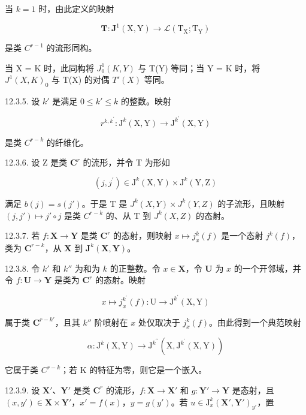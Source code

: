 当 \(k = 1\) 时，由此定义的映射

\[
\mathbf {T} \colon \mathbf {J} ^ {1} (\mathrm{X}, \mathrm{Y}) \rightarrow \mathcal {L} (\mathrm{T} _ {\mathrm{X}}; \mathrm{T} _ {\mathrm{Y}})
\]

是类 \(C^{r-1}\) 的流形同构。

当 X = K 时，此同构将 \(J_{0}^{1}(K, Y)\) 与 T(Y) 等同；当 Y = K 时，将 \(J^{1}(X, K)_{0}\) 与 T(X) 的对偶 \(T'(X)\) 等同。

12.3.5. 设 \(k'\) 是满足 \(0 \leqslant k' \leqslant k\) 的整数。映射

\[
r ^ {k, k ^ {\prime}}: \mathrm{J} ^ {k} (\mathrm{X}, \mathrm{Y}) \rightarrow \mathrm{J} ^ {k ^ {\prime}} (\mathrm{X}, \mathrm{Y})\tag{cf. 12.1.5}
\]

是类 \(C^{r-k}\) 的纤维化。

12.3.6. 设 Z 是类 \(\mathbf{C}^r\) 的流形，并令 T 为形如

\[
(j, j ^ {\prime}) \in \mathrm{J} ^ {k} (\mathrm{X}, \mathrm{Y}) \times \mathrm{J} ^ {k} (\mathrm{Y}, \mathrm{Z})
\]

满足 \(b(j) = s(j')\)。于是 T 是 \(J^k(X, Y) \times J^k(Y, Z)\) 的子流形，且映射 \((j, j') \mapsto j' \circ j\) 是类 \(C^{r-k}\) 的、从 T 到 \(J^k(X, Z)\) 的态射。

12.3.7. 若 \(f: \mathbf{X} \to \mathbf{Y}\) 是类 \(\mathbf{C}^r\) 的态射，则映射 \(x \mapsto j_x^k(f)\) 是一个态射 \(j^k(f)\)，类为 \(\mathbf{C}^{r-k}\)，从 \(\mathbf{X}\) 到 \(\mathbf{J}^k(\mathbf{X}, \mathbf{Y})\)。

12.3.8. 令 \(k'\) 和 \(k''\) 为和为 \(k\) 的正整数。令 \(x \in \mathbf{X}\)，令 \(\mathbf{U}\) 为 \(x\) 的一个开邻域，并令 \(f: \mathbf{U} \to \mathbf{Y}\) 是类为 \(\mathbf{C}^{r}\) 的态射。映射

\[
x \mapsto j _ {x} ^ {k ^ {\prime}} (f) \colon \mathrm{U} \to \mathrm{J} ^ {k ^ {\prime}} (\mathrm{X}, \mathrm{Y})
\]

属于类 \(\mathbf{C}^{r - k'}\)，且其 \(k''\) 阶喷射在 \(x\) 处仅取决于 \(j_x^k (f)\)。由此得到一个典范映射

\[
\alpha \colon \mathrm{J} ^ {k} (\mathrm{X}, \mathrm{Y}) \rightarrow \mathrm{J} ^ {k ^ {\prime \prime}} (\mathrm{X}, \mathrm{J} ^ {k ^ {\prime}} (\mathrm{X}, \mathrm{Y}))
\]

它属于类 \(C^{r-k}\)；若 K 的特征为零，则它是一个嵌入。

12.3.9. 设 \(\mathbf{X}'\)、\(\mathbf{Y}'\) 是类 \(\mathbf{C}^r\) 的流形，\(f: \mathbf{X} \to \mathbf{X}'\) 和 \(g: \mathbf{Y}' \to \mathbf{Y}\) 是态射，且 \((x, y') \in \mathbf{X} \times \mathbf{Y}'\)，\(x' = f(x)\)，\(y = g(y')\)。若 \(u \in \mathrm{J}_x^k(\mathbf{X}', \mathbf{Y}')_{y'}\)，置

